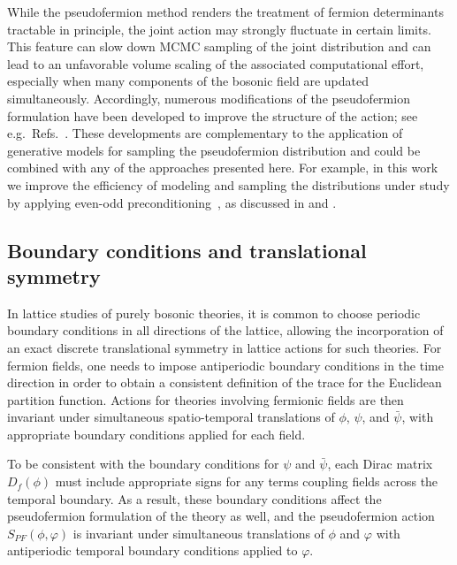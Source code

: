 \documentclass[aps,prd,twocolumn,nofootinbib,superscriptaddress,preprintnumbers]{revtex4-1}
\begin{document}
While the pseudofermion method renders the treatment of fermion determinants tractable in principle, the joint action may strongly fluctuate in certain limits. This feature can slow down MCMC sampling of the joint distribution and can lead to an unfavorable volume scaling of the associated computational effort, especially when many components of the bosonic field are updated simultaneously. Accordingly, numerous modifications of the pseudofermion formulation have been developed to improve the structure of the action; see e.g.~Refs.~\cite{deForcrand:1996ck,deForcrand:1998sv,Peardon:2000si,Hasenbusch:2001xh,Clark:2006wq,Clark:2006fx}. These developments are complementary to the application of generative models for sampling the pseudofermion distribution and could be combined with any of the approaches presented here. For example, in this work we improve the efficiency of modeling and sampling the distributions under study by applying even-odd preconditioning~\cite{DeGrand:1990dk}, as discussed in  and .


\subsection{Boundary conditions and translational symmetry}
\label{sec:fermions-sym}

In lattice studies of purely bosonic theories, it is common to choose periodic boundary conditions in all directions of the lattice, allowing the incorporation of an exact discrete translational symmetry in lattice actions for such theories. For fermion fields, one needs to impose antiperiodic boundary conditions in the time direction in order to obtain a consistent definition of the trace for the Euclidean partition function. Actions for theories involving fermionic fields are then invariant under simultaneous spatio-temporal translations of $\phi$, $\psi$, and $\bar\psi$, with appropriate boundary conditions applied for each field.

To be consistent with the boundary conditions for $\psi$ and $\bar{\psi}$, each Dirac matrix $D_f(\phi)$ must include appropriate signs for any terms coupling fields across the temporal boundary. As a result, these boundary conditions affect the pseudofermion formulation of the theory as well, and the pseudofermion action $S_{PF}(\phi,\varphi)$ is invariant under simultaneous translations of $\phi$ and $\varphi$ with antiperiodic temporal boundary conditions applied to $\varphi$.
\end{document}
